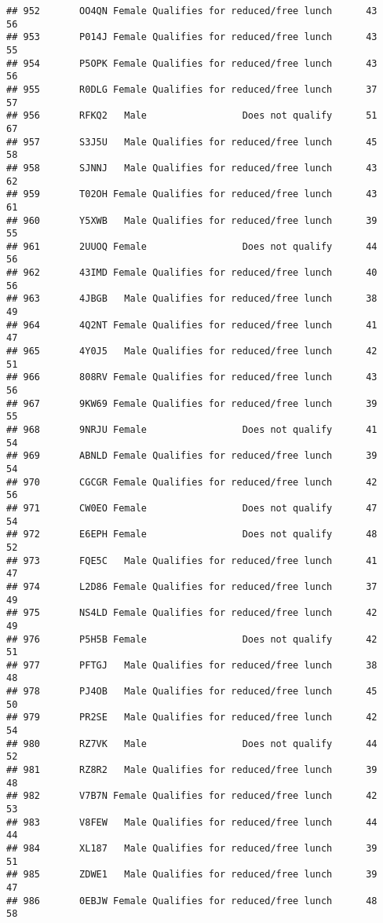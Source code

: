 \documentclass[
]{article}
\begin{document}
\begin{verbatim}
## 952       OO4QN Female Qualifies for reduced/free lunch      43       56
## 953       P014J Female Qualifies for reduced/free lunch      43       55
## 954       P5OPK Female Qualifies for reduced/free lunch      43       56
## 955       R0DLG Female Qualifies for reduced/free lunch      37       57
## 956       RFKQ2   Male                 Does not qualify      51       67
## 957       S3J5U   Male Qualifies for reduced/free lunch      45       58
## 958       SJNNJ   Male Qualifies for reduced/free lunch      43       62
## 959       T02OH Female Qualifies for reduced/free lunch      43       61
## 960       Y5XWB   Male Qualifies for reduced/free lunch      39       55
## 961       2UUOQ Female                 Does not qualify      44       56
## 962       43IMD Female Qualifies for reduced/free lunch      40       56
## 963       4JBGB   Male Qualifies for reduced/free lunch      38       49
## 964       4Q2NT Female Qualifies for reduced/free lunch      41       47
## 965       4Y0J5   Male Qualifies for reduced/free lunch      42       51
## 966       808RV Female Qualifies for reduced/free lunch      43       56
## 967       9KW69 Female Qualifies for reduced/free lunch      39       55
## 968       9NRJU Female                 Does not qualify      41       54
## 969       ABNLD Female Qualifies for reduced/free lunch      39       54
## 970       CGCGR Female Qualifies for reduced/free lunch      42       56
## 971       CW0EO Female                 Does not qualify      47       54
## 972       E6EPH Female                 Does not qualify      48       52
## 973       FQE5C   Male Qualifies for reduced/free lunch      41       47
## 974       L2D86 Female Qualifies for reduced/free lunch      37       49
## 975       NS4LD Female Qualifies for reduced/free lunch      42       49
## 976       P5H5B Female                 Does not qualify      42       51
## 977       PFTGJ   Male Qualifies for reduced/free lunch      38       48
## 978       PJ4OB   Male Qualifies for reduced/free lunch      45       50
## 979       PR2SE   Male Qualifies for reduced/free lunch      42       54
## 980       RZ7VK   Male                 Does not qualify      44       52
## 981       RZ8R2   Male Qualifies for reduced/free lunch      39       48
## 982       V7B7N Female Qualifies for reduced/free lunch      42       53
## 983       V8FEW   Male Qualifies for reduced/free lunch      44       44
## 984       XL187   Male Qualifies for reduced/free lunch      39       51
## 985       ZDWE1   Male Qualifies for reduced/free lunch      39       47
## 986       0EBJW Female Qualifies for reduced/free lunch      48       58

\end{verbatim}
\end{document}
